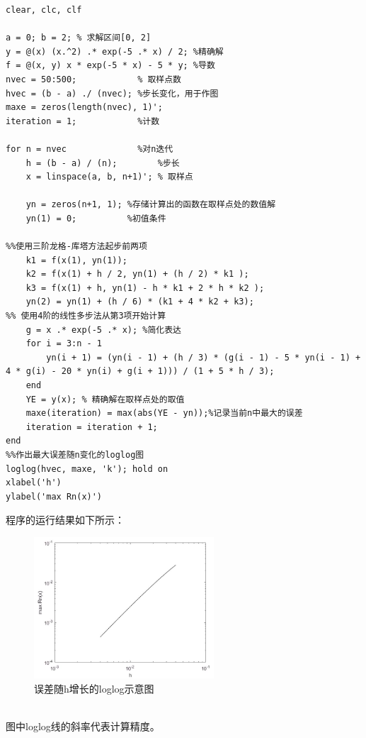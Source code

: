 \documentclass[12pt,a4paper,utf8]{ctexart}
\begin{document}
\begin{enumerate}
\begin{enumerate}
            \begin{lstlisting}[frame=single]
clear, clc, clf

a = 0; b = 2; % 求解区间[0, 2]
y = @(x) (x.^2) .* exp(-5 .* x) / 2; %精确解
f = @(x, y) x * exp(-5 * x) - 5 * y; %导数
nvec = 50:500;            % 取样点数
hvec = (b - a) ./ (nvec); %步长变化，用于作图
maxe = zeros(length(nvec), 1)';
iteration = 1;            %计数

for n = nvec              %对n迭代
    h = (b - a) / (n);        %步长
    x = linspace(a, b, n+1)'; % 取样点
    
    yn = zeros(n+1, 1); %存储计算出的函数在取样点处的数值解
    yn(1) = 0;          %初值条件

%%使用三阶龙格-库塔方法起步前两项
    k1 = f(x(1), yn(1));
    k2 = f(x(1) + h / 2, yn(1) + (h / 2) * k1 );
    k3 = f(x(1) + h, yn(1) - h * k1 + 2 * h * k2 );
    yn(2) = yn(1) + (h / 6) * (k1 + 4 * k2 + k3);   
%% 使用4阶的线性多步法从第3项开始计算
    g = x .* exp(-5 .* x); %简化表达
    for i = 3:n - 1
        yn(i + 1) = (yn(i - 1) + (h / 3) * (g(i - 1) - 5 * yn(i - 1) + 4 * g(i) - 20 * yn(i) + g(i + 1))) / (1 + 5 * h / 3);
    end
    YE = y(x); % 精确解在取样点处的取值
    maxe(iteration) = max(abs(YE - yn));%记录当前n中最大的误差
    iteration = iteration + 1;
end
%%作出最大误差随n变化的loglog图
loglog(hvec, maxe, 'k'); hold on
xlabel('h')
ylabel('max Rn(x)')
            \end{lstlisting}
            程序的运行结果如下所示：\\
            \begin{figure}[h]
                \centering
                \includegraphics[width=0.6\textwidth]{T3D.JPG}
                \caption{误差随h增长的loglog示意图}
            \end{figure}\\
            图中loglog线的斜率代表计算精度。

       \end{enumerate}



\end{enumerate}
\end{document}
